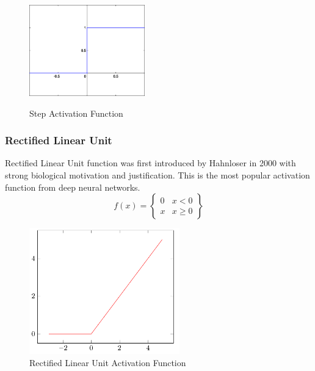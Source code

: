 \documentclass[12pt, a4paper]{report}
\begin{document}
\begin{figure}[h]
\centering	
\includegraphics[width=5cm]{step.png}\\
\caption{Step Activation Function}
\label{fig:step}
\end{figure} 	

\subsubsection{Rectified Linear Unit}\label{sec:ReLU}
Rectified Linear Unit function was first introduced by Hahnloser in 2000 \cite{ReLU} with strong biological motivation and justification. This is the most popular activation function from deep neural networks.\\ 
\begin{equation}\label{eq:ReLU}
f(x) = \begin{Bmatrix}
0 & x < 0 \\ 
x & x \geq 0 
\end{Bmatrix}
\end{equation}
\begin{figure}[h]
\centering
\includegraphics[width=6.5cm]{relu.png}
\caption{Rectified Linear Unit Activation Function}
\label{fig:ReLU}
\end{figure} 
\end{document}
